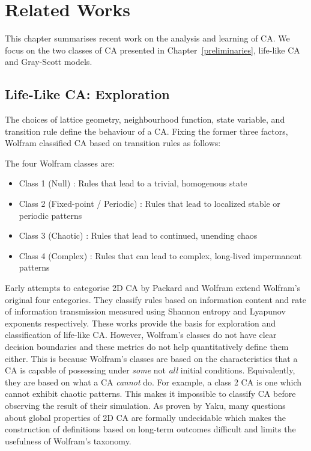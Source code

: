 \chapter{Related Works}

This chapter summarises recent work on the analysis and learning of CA. We focus on the two classes of CA presented in Chapter~\ref{preliminaries}, life-like CA and Gray-Scott models.

\section{Life-Like CA: Exploration} \label{sec: life-like-exploration}

The choices of lattice geometry, neighbourhood function, state variable, and transition rule define the behaviour of a CA. Fixing the former three factors, Wolfram\cite{wolfram1986theory} classified CA based on transition rules as follows:
\begin{definition}\label{def:wolfram-classes} The four Wolfram classes are:
\begin{itemize}
  \item Class 1 (Null) : Rules that lead to a trivial, homogenous state
  \item Class 2 (Fixed-point / Periodic) : Rules that lead to localized stable or periodic patterns
  \item Class 3 (Chaotic) : Rules that lead to continued, unending chaos
  \item Class 4 (Complex) : Rules that can lead to complex, long-lived impermanent patterns
\end{itemize}
\end{definition}

Early attempts to categorise 2D CA by Packard and Wolfram\cite{packard1985two} extend Wolfram's original four categories. They classify rules based on information content and rate of information transmission measured using Shannon entropy and Lyapunov exponents respectively. These works provide the basis for exploration and classification of life-like CA. However, Wolfram's classes do not have clear decision boundaries and these metrics do not help quantitatively define them either. This is because Wolfram's classes are based on the characteristics that a CA is capable of possessing under \textit{some} not \textit{all} initial conditions. Equivalently, they are based on what a CA \textit{cannot} do.  For example, a class 2 CA is one which cannot exhibit chaotic patterns. This makes it impossible to classify CA before observing the result of their simulation. As proven by Yaku\cite{yaku1973constructibility}, many questions about global properties of 2D CA are formally undecidable which makes the construction of definitions based on long-term outcomes difficult and limits the usefulness of Wolfram's taxonomy.\\

